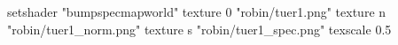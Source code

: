 setshader "bumpspecmapworld"
   texture 0 "robin/tuer1.png"
   texture n "robin/tuer1_norm.png"
   texture s "robin/tuer1_spec.png"
texscale 0.5